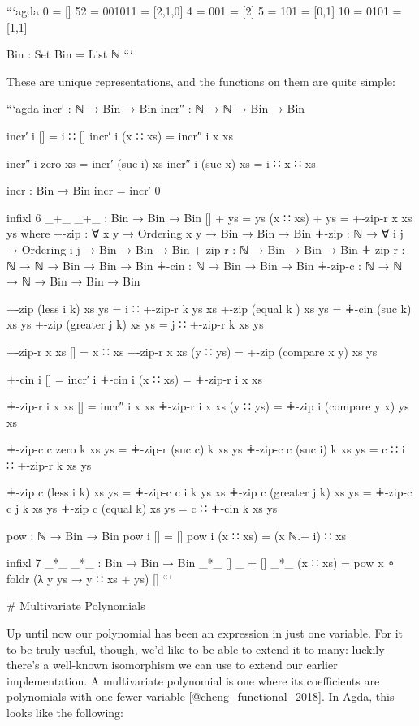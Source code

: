 \documentclass{article}
\begin{document}
```agda
0  = []
52 = 001011 = [2,1,0]
4  = 001    = [2]
5  = 101    = [0,1]
10 = 0101   = [1,1]

Bin : Set
Bin = List ℕ
```

These are unique representations, and the functions on them are quite simple:

```agda
incr′ : ℕ → Bin → Bin
incr″ : ℕ → ℕ → Bin → Bin

incr′ i [] = i ∷ []
incr′ i (x ∷ xs) = incr″ i x xs

incr″ i zero xs = incr′ (suc i) xs
incr″ i (suc x) xs = i ∷ x ∷ xs

incr : Bin → Bin
incr = incr′ 0

infixl 6 _+_
_+_ : Bin → Bin → Bin
[] + ys = ys
(x ∷ xs) + ys = +-zip-r x xs ys
  where
  +-zip   :     ∀ {x y} → Ordering x y → Bin → Bin → Bin
  ∔-zip   : ℕ → ∀ {i j} → Ordering i j → Bin → Bin → Bin
  +-zip-r :     ℕ → Bin → Bin → Bin
  ∔-zip-r : ℕ → ℕ → Bin → Bin → Bin
  ∔-cin   : ℕ → Bin → Bin → Bin
  ∔-zip-c : ℕ → ℕ → ℕ → Bin → Bin → Bin

  +-zip (less    i k) xs ys = i ∷ +-zip-r k ys xs
  +-zip (equal   k  ) xs ys = ∔-cin (suc k) xs ys
  +-zip (greater j k) xs ys = j ∷ +-zip-r k xs ys

  +-zip-r x xs [] = x ∷ xs
  +-zip-r x xs (y ∷ ys) = +-zip (compare x y) xs ys

  ∔-cin i [] = incr′ i
  ∔-cin i (x ∷ xs) = ∔-zip-r i x xs

  ∔-zip-r i x xs [] = incr″ i x xs
  ∔-zip-r i x xs (y ∷ ys) = ∔-zip i (compare y x) ys xs

  ∔-zip-c c zero k xs ys = ∔-zip-r (suc c) k xs ys
  ∔-zip-c c (suc i) k xs ys = c ∷ i ∷ +-zip-r k xs ys

  ∔-zip c (less    i k) xs ys = ∔-zip-c c i k ys xs
  ∔-zip c (greater j k) xs ys = ∔-zip-c c j k xs ys
  ∔-zip c (equal     k) xs ys = c ∷ ∔-cin k xs ys

pow : ℕ → Bin → Bin
pow i [] = []
pow i (x ∷ xs) = (x ℕ.+ i) ∷ xs

infixl 7 _*_
_*_ : Bin → Bin → Bin
_*_ [] _ = []
_*_ (x ∷ xs) = pow x ∘ foldr (λ y ys → y ∷ xs + ys) []
```

# Multivariate Polynomials

Up until now our polynomial has been an expression in just one variable. For it
to be truly useful, though, we'd like to be able to extend it to many: luckily
there's a well-known isomorphism we can use to extend our earlier
implementation. A multivariate polynomial is one where its coefficients are
polynomials with one fewer variable [@cheng_functional_2018]. In Agda, this
looks like the following:
\end{document}
